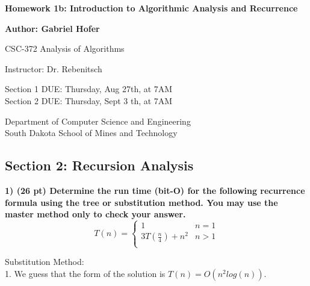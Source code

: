 \documentclass[12pt, a4paper]{article}
\begin{document}
\begin{titlepage}
   \begin{center}
       \vspace*{1cm}
       \large
       \textbf{Homework 1b: Introduction to Algorithmic Analysis and Recurrence}
       \normalsize

       \vspace{0.5cm}

       \textbf{Author: Gabriel Hofer}

       \vspace{0.5cm}

       CSC-372 Analysis of Algorithms

       \vspace{0.5cm}

       Instructor: Dr. Rebenitsch

       \vspace{0.5cm}

       Section 1 DUE: Thursday, Aug 27th, at 7AM \\ 
       Section 2 DUE: Thursday, Sept 3 th, at 7AM  

       \vfill

       Department of Computer Science and Engineering\\
       South Dakota School of Mines and Technology\\

   \end{center}
\end{titlepage}
\newpage
\subsection*{Section 2: Recursion Analysis}

\textbf{1) (26 pt) Determine the run time (bit-O) for the following recurrence formula using the tree or substitution method.
You may use the master method only to check your answer. } \\ 

\[
  T(n) =  
  \begin{cases}
    1 & n = 1  \\
    3T(\frac{n}{4}) + n^2 & n > 1  \\
  \end{cases}
\]

Substitution Method: \\ 

1. We guess that the form of the solution is $ T(n) = O(n^2 log(n)) $.
\end{document}
